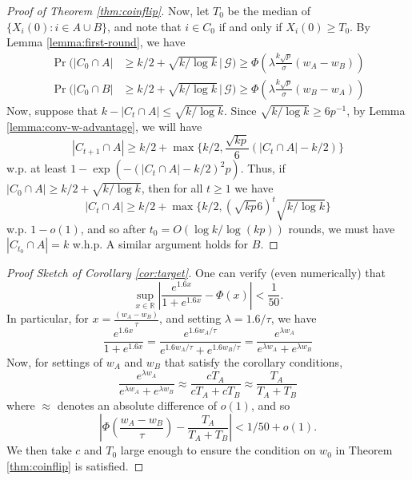 \documentclass{article}
\theoremstyle{remark}
\newcommand{\R}{\mathbb{R}}
\newcommand{\1}{\mathbbm{1}}
\newcommand{\cond}{\, | \,}
\begin{document}
\begin{proof}[Proof of Theorem \ref{thm:coinflip}]
    Now, let $T_0$ be the median of $\{X_i(0) \colon i \in A \cup B\}$, and note that $i \in C_0$ if and only if $X_i(0) \ge T_0$. By Lemma \ref{lemma:first-round}, we have
    \begin{align*}
        \Pr(|C_0 \cap A| &\ge k/2 + \sqrt{k / \log k} \cond \mathcal G) \ge \Phi\left(\lambda \frac{k\sqrt{p}}{\sigma}(w_A - w_B)\right)\\
        \Pr(|C_0 \cap B| &\ge k/2 + \sqrt{k / \log k} \cond \mathcal G) \ge \Phi\left(\lambda \frac{k\sqrt{p}}{\sigma}(w_B - w_A)\right)
    \end{align*} Now, suppose that $ k - |C_t \cap A| \le \sqrt{k / \log k}$. Since $\sqrt{k / \log k} \ge 6 p^{-1}$,  by Lemma \ref{lemma:conv-w-advantage}, we will have 
    \[|C_{t+1} \cap A| \ge k/2 + \max\{k/2, \frac{\sqrt{kp}}{6}  (|C_t \cap A| - k/2)\}\]
    w.p. at least $1 - \exp\left(-(|C_t \cap A| - k/2)^2 p\right)$.
    Thus, if $|C_0 \cap A| \ge k/2 + \sqrt{k / \log k}$, then for all $t \ge 1$ we have
    \[|C_t \cap A| \ge k/2 + \max\{k/2, \left(\sqrt{kp}{6} \right)^t \sqrt{k / \log k}\}\]
    w.p. $1- o(1)$, and so after $t_0 = O(\log k / \log (kp))$ rounds, we must have $|C_{t_0} \cap A| = k$ w.h.p. A similar argument holds for $B$.
\end{proof}

\begin{proof}[Proof Sketch of Corollary \ref{cor:target}]
    One can verify (even numerically) that
    \[\sup_{x \in \R}\left|\frac{e^{1.6x}}{1 + e^{1.6x}} - \Phi(x)\right| < \frac{1}{50}.\]
    In particular, for $x = \frac{(w_A-w_B)}{\tau}$, and setting $\lambda = 1.6 / \tau$, we have
    \[ \frac{e^{1.6x}}{1+e^{1.6x}} = \frac{e^{1.6 w_A / \tau}}{e^{1.6 w_A / \tau}+ e^{1.6 w_B / \tau}} = \frac{e^{\lambda w_A}}{e^{\lambda w_A} + e^{\lambda w_B}} \]
    Now, for settings of $w_A$ and $w_B$ that satisfy the corollary conditions,
    \[\frac{e^{\lambda w_A}}{e^{\lambda w_A} + e^{\lambda w_B}} \approx \frac{c T_A}{cT_A + cT_B} \approx \frac{T_A}{T_A + T_B}\]
    where $\approx$ denotes an absolute difference of $o(1)$, and so
    \[\left|\Phi\left(\frac{w_A - w_B}{\tau}\right) - \frac{T_A}{T_A + T_B}\right| < 1/ 50 + o(1).\]
    We then take $c$ and $T_0$ large enough to ensure the condition on $w_0$ in Theorem \ref{thm:coinflip} is satisfied.
\end{proof}
\end{document}
